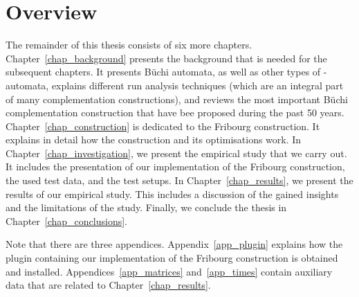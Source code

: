 \section{Overview}
\label{1_overview}
The remainder of this thesis consists of six more chapters. Chapter~\ref{chap_background} presents the background that is needed for the subsequent chapters. It presents Büchi automata, as well as other types of \om-automata, explains different run analysis techniques (which are an integral part of many complementation constructions), and reviews the most important Büchi complementation construction that have bee proposed during the past 50 years. Chapter~\ref{chap_construction} is dedicated to the Fribourg construction. It explains in detail how the construction and its optimisations work. In Chapter~\ref{chap_investigation}, we present the empirical study that we carry out. It includes the presentation of our implementation of the Fribourg construction, the used test data, and the test setups. In Chapter~\ref{chap_results}, we present the results of our empirical study. This includes a discussion of the gained insights and the limitations of the study. Finally, we conclude the thesis in Chapter~\ref{chap_conclusions}.

Note that there are three appendices. Appendix~\ref{app_plugin} explains how the plugin containing our implementation of the Fribourg construction is obtained and installed. Appendices~\ref{app_matrices} and~\ref{app_times} contain auxiliary data that are related to Chapter~\ref{chap_results}.





